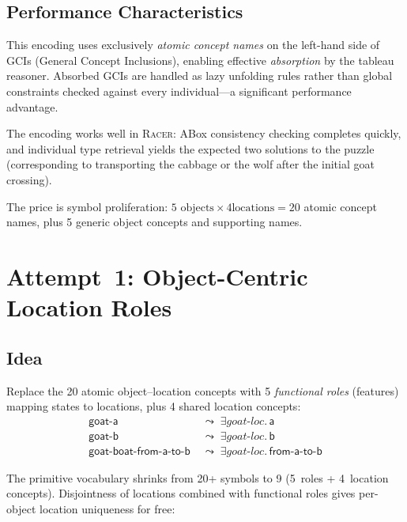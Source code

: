 \documentclass[11pt,a4paper]{article}
\newcommand{\DLsome}[2]{\exists #1.\,#2}
\newcommand{\Racer}{\textsc{Racer}}
\newcommand{\concept}[1]{\ensuremath{\mathsf{#1}}}
\newcommand{\role}[1]{\ensuremath{\mathit{#1}}}
\begin{document}
\subsection{Performance Characteristics}

This encoding uses exclusively \emph{atomic concept names} on the
left-hand side of GCIs (General Concept Inclusions), enabling effective
\emph{absorption} by the tableau reasoner.  Absorbed GCIs are handled as
lazy unfolding rules rather than global constraints checked against every
individual---a significant performance advantage.

The encoding works well in \Racer{}: ABox consistency checking completes
quickly, and individual type retrieval yields the expected two solutions
to the puzzle (corresponding to transporting the cabbage or the wolf
after the initial goat crossing).

The price is symbol proliferation: $5 \text{ objects} \times 4 \text{
locations} = 20$ atomic concept names, plus 5 generic object concepts
and supporting names.

\section{Attempt~1: Object-Centric Location Roles}
\label{sec:attempt1}

\subsection{Idea}

Replace the 20 atomic object--location concepts with 5 \emph{functional
roles} (features) mapping states to locations, plus 4 shared location
concepts:
\begin{align*}
\concept{goat\text{-}a} &\;\leadsto\; \DLsome{\role{goat\text{-}loc}}{\concept{a}} \\
\concept{goat\text{-}b} &\;\leadsto\; \DLsome{\role{goat\text{-}loc}}{\concept{b}} \\
\concept{goat\text{-}boat\text{-}from\text{-}a\text{-}to\text{-}b} &\;\leadsto\; \DLsome{\role{goat\text{-}loc}}{\concept{from\text{-}a\text{-}to\text{-}b}}
\end{align*}

The primitive vocabulary shrinks from 20+ symbols to 9 (5~roles +
4~location concepts).  Disjointness of locations combined with
functional roles gives per-object location uniqueness for free:
\end{document}
